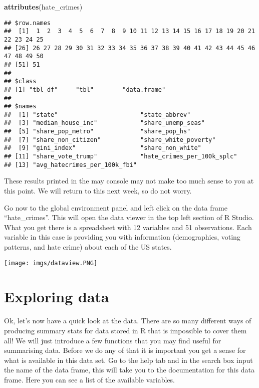 \documentclass[
]{book}
\newenvironment{Shaded}{\begin{snugshade}}{\end{snugshade}}
\newcommand{\FunctionTok}[1]{\textcolor[rgb]{0.13,0.29,0.53}{\textbf{#1}}}
\newcommand{\NormalTok}[1]{#1}
\begin{document}
\begin{Shaded}
\begin{Highlighting}[]
\FunctionTok{attributes}\NormalTok{(hate\_crimes)}
\end{Highlighting}
\end{Shaded}

\begin{verbatim}
## $row.names
##  [1]  1  2  3  4  5  6  7  8  9 10 11 12 13 14 15 16 17 18 19 20 21 22 23 24 25
## [26] 26 27 28 29 30 31 32 33 34 35 36 37 38 39 40 41 42 43 44 45 46 47 48 49 50
## [51] 51
## 
## $class
## [1] "tbl_df"     "tbl"        "data.frame"
## 
## $names
##  [1] "state"                       "state_abbrev"               
##  [3] "median_house_inc"            "share_unemp_seas"           
##  [5] "share_pop_metro"             "share_pop_hs"               
##  [7] "share_non_citizen"           "share_white_poverty"        
##  [9] "gini_index"                  "share_non_white"            
## [11] "share_vote_trump"            "hate_crimes_per_100k_splc"  
## [13] "avg_hatecrimes_per_100k_fbi"
\end{verbatim}

These results printed in the may console may not make too much sense to you at this point. We will return to this next week, so do not worry.

Go now to the global environment panel and left click on the data frame ``hate\_crimes''. This will open the data viewer in the top left section of R Studio. What you get there is a spreadsheet with 12 variables and 51 observations. Each variable in this case is providing you with information (demographics, voting patterns, and hate crime) about each of the US states.

\texttt{[image: imgs/dataview.PNG]}

\section{Exploring data}\label{exploring-data}

Ok, let's now have a quick look at the data. There are so many different ways of producing summary stats for data stored in R that is impossible to cover them all! We will just introduce a few functions that you may find useful for summarising data. Before we do any of that it is important you get a sense for what is available in this data set. Go to the help tab and in the search box input the name of the data frame, this will take you to the documentation for this data frame. Here you can see a list of the available variables.
\end{document}
